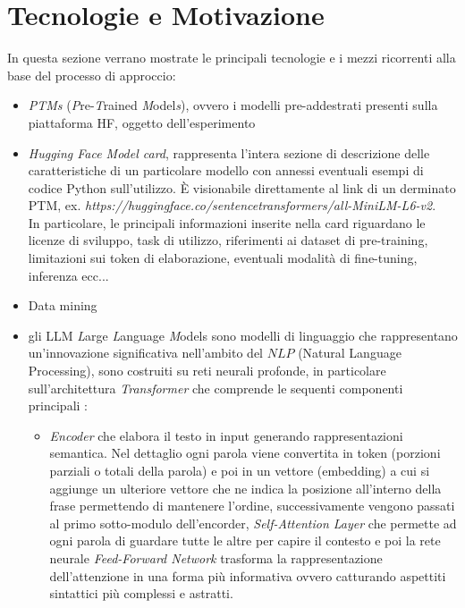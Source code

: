 \documentclass{article}
\begin{document}
\section{Tecnologie e Motivazione}
In questa sezione verrano mostrate le principali tecnologie e i mezzi ricorrenti alla base del processo di approccio:
\begin{itemize}
    \item \textit{PTMs} (\textit{P}re-\textit{T}rained \textit{M}odel\textit{s}), ovvero i modelli pre-addestrati presenti sulla piattaforma HF, oggetto dell'esperimento
    \item \textit{Hugging Face Model card}, rappresenta l'intera sezione di descrizione delle caratteristiche di un particolare modello con annessi eventuali esempi di codice Python sull'utilizzo. È visionabile direttamente al link di un derminato PTM, ex. \textit{https://huggingface.co/sentencetransformers/all-MiniLM-L6-v2}.\\
    In particolare, le principali informazioni inserite nella card riguardano le licenze di sviluppo, task di utilizzo, riferimenti ai dataset di pre-training, limitazioni sui token di elaborazione, eventuali modalità di fine-tuning, inferenza ecc...
    \item Data mining
    \item gli LLM \textit{L}arge \textit{L}anguage \textit{M}odels sono modelli di linguaggio che rappresentano un'innovazione significativa nell'ambito del \(NLP\) (Natural Language Processing), sono costruiti su reti neurali profonde, in particolare sull'architettura \textit{Transformer} che comprende le sequenti componenti principali \cite{di2025use}:
\begin{itemize}
    \item \textit{Encoder} che elabora il testo in input generando rappresentazioni semantica. Nel dettaglio ogni parola viene convertita in token (porzioni parziali o totali della parola) e poi in un vettore (embedding) a cui si aggiunge un ulteriore vettore che ne indica la posizione all'interno della frase permettendo di mantenere l'ordine, successivamente vengono passati al primo sotto-modulo dell'encorder, \textit{Self-Attention Layer} che permette ad ogni parola di guardare tutte le altre per capire il contesto e poi la rete neurale \textit{Feed-Forward Network} trasforma la rappresentazione dell'attenzione in una forma più informativa ovvero catturando aspettiti sintattici più complessi e astratti.
    

\end{itemize}
\end{itemize}
\end{document}
